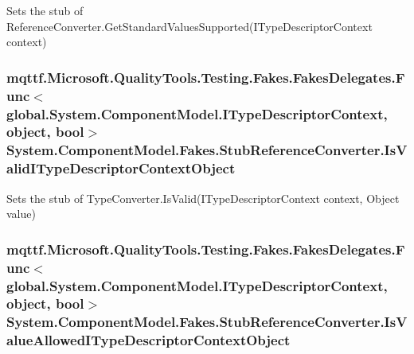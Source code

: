 Sets the stub of Reference\-Converter.\-Get\-Standard\-Values\-Supported(\-I\-Type\-Descriptor\-Context context)

\hypertarget{class_system_1_1_component_model_1_1_fakes_1_1_stub_reference_converter_afc6b0d51e67fd36968dd67ba43d66533}{
\subsubsection[{Is\-Valid\-I\-Type\-Descriptor\-Context\-Object}]{\setlength{\rightskip}{0pt plus 5cm}mqttf.\-Microsoft.\-Quality\-Tools.\-Testing.\-Fakes.\-Fakes\-Delegates.\-Func$<$global.\-System.\-Component\-Model.\-I\-Type\-Descriptor\-Context, object, bool$>$ System.\-Component\-Model.\-Fakes.\-Stub\-Reference\-Converter.\-Is\-Valid\-I\-Type\-Descriptor\-Context\-Object}}\label{class_system_1_1_component_model_1_1_fakes_1_1_stub_reference_converter_afc6b0d51e67fd36968dd67ba43d66533}


Sets the stub of Type\-Converter.\-Is\-Valid(\-I\-Type\-Descriptor\-Context context, Object value)

\hypertarget{class_system_1_1_component_model_1_1_fakes_1_1_stub_reference_converter_ae4679798bd27e2c5f28e887c62b4007c}{
\subsubsection[{Is\-Value\-Allowed\-I\-Type\-Descriptor\-Context\-Object}]{\setlength{\rightskip}{0pt plus 5cm}mqttf.\-Microsoft.\-Quality\-Tools.\-Testing.\-Fakes.\-Fakes\-Delegates.\-Func$<$global.\-System.\-Component\-Model.\-I\-Type\-Descriptor\-Context, object, bool$>$ System.\-Component\-Model.\-Fakes.\-Stub\-Reference\-Converter.\-Is\-Value\-Allowed\-I\-Type\-Descriptor\-Context\-Object}}\label{class_system_1_1_component_model_1_1_fakes_1_1_stub_reference_converter_ae4679798bd27e2c5f28e887c62b4007c}


